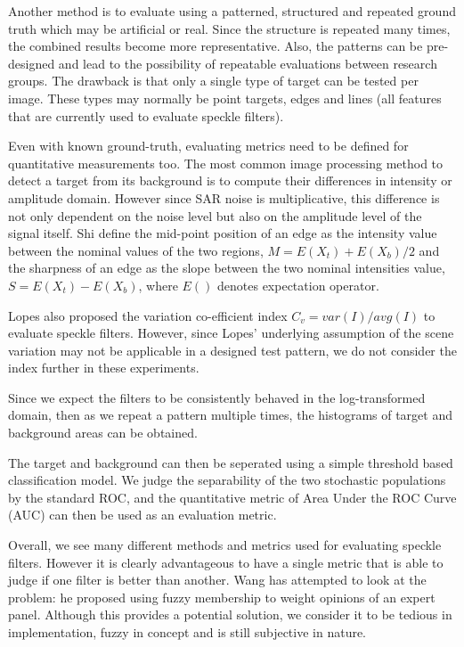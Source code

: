 \documentclass[journal]{IEEEtran}
\begin{document}

Another method is to evaluate using a patterned, structured and repeated ground truth which may be artificial or real.
Since the structure is repeated many times, the combined results become more representative. Also, the patterns can be pre-designed and lead to the possibility of repeatable evaluations between research groups.
The drawback is that only a single type of target can be tested per image. These types may normally be point targets, edges and lines (all features that are currently used to evaluate speckle filters).

Even with known ground-truth, evaluating metrics need to be defined for quantitative measurements too. The most common image processing method to detect a target from its background is to compute their differences in intensity or amplitude domain. However since SAR noise is multiplicative, this difference is not only dependent on the noise level but also on the amplitude level of the signal itself.
Shi define the mid-point position of an edge as the intensity value between the nominal values of the two regions, $M= { E(X_t) + E(X_b)}/{2}$
	and the sharpness of an edge as the slope between the two nominal intensities value, $S=E(X_t)-E(X_b)$, 
	where $E()$ denotes expectation operator. 

Lopes also proposed the variation co-efficient index $C_v = var(I)/avg(I)$ to evaluate speckle filters.
However, since Lopes' underlying assumption of the scene variation may not be applicable in a designed test pattern, we do not consider the index further in these experiments.

Since we expect the filters to be consistently behaved in the log-transformed domain, then as we repeat a pattern multiple times, the histograms of target and background areas can be obtained.

The target and background can then be seperated using a simple threshold based classification model.
We judge the separability of the two stochastic populations by the standard ROC, and the quantitative metric of Area Under the ROC Curve (AUC) can then be used as an evaluation metric.

Overall, we see many different methods and metrics used for evaluating speckle filters. However it is clearly advantageous to have a single metric that is able to judge if one filter is better than another. Wang has attempted to look at the problem: he proposed using fuzzy membership to weight opinions of an expert panel. Although this provides a potential solution, we consider it to be tedious in implementation, fuzzy in concept and is still subjective in nature.
\end{document}
